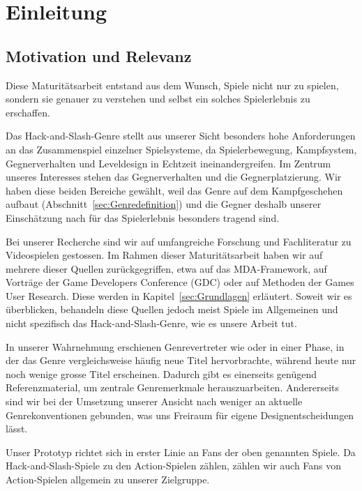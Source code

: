 \documentclass[../Main.tex]{subfiles}
\begin{document}
\section{Einleitung}

\subsection{Motivation und Relevanz}

Diese Maturitätsarbeit entstand aus dem Wunsch, Spiele nicht nur zu spielen, sondern sie genauer zu verstehen und selbst ein solches Spielerlebnis zu erschaffen.

Das Hack-and-Slash-Genre stellt aus unserer Sicht besonders hohe Anforderungen an das Zusammenspiel einzelner Spielsysteme, da Spielerbewegung, Kampfsystem, Gegnerverhalten und Leveldesign in Echtzeit ineinandergreifen. Im Zentrum unseres Interesses stehen das Gegnerverhalten und die Gegnerplatzierung. Wir haben diese beiden Bereiche gewählt, weil das Genre auf dem Kampfgeschehen aufbaut (Abschnitt~\ref{sec:Genredefinition}) und die Gegner deshalb unserer Einschätzung nach für das Spielerlebnis besonders tragend sind.

Bei unserer Recherche sind wir auf umfangreiche Forschung und Fachliteratur zu Videospielen gestossen. Im Rahmen dieser Maturitätsarbeit haben wir auf mehrere dieser Quellen zurückgegriffen, etwa auf das MDA-Framework\autocite{hunicke2004mda}, auf Vorträge der Game Developers Conference (GDC)\autocite{gdc_tenprinciples2010,gdc_movingmountains2020,gdc_horizonquests2018} oder auf Methoden der Games User Research\autocite{drachen2018gamesuserresearch}. Diese werden in Kapitel~\ref{sec:Grundlagen} erläutert. Soweit wir es überblicken, behandeln diese Quellen jedoch meist Spiele im Allgemeinen und nicht spezifisch das Hack-and-Slash-Genre, wie es unsere Arbeit tut.

In unserer Wahrnehmung erschienen Genrevertreter wie \autocite{koeitechmo_ninjagaiden_2012} oder \autocite{platinumgames_nierautomata_2017} in einer Phase, in der das Genre vergleichsweise häufig neue Titel hervorbrachte, während heute nur noch wenige grosse Titel erscheinen. Dadurch gibt es einerseits genügend Referenzmaterial, um zentrale Genremerkmale herauszuarbeiten. Andererseits sind wir bei der Umsetzung unserer Ansicht nach weniger an aktuelle Genrekonventionen gebunden, was uns Freiraum für eigene Designentscheidungen lässt.

Unser Prototyp richtet sich in erster Linie an Fans der oben genannten Spiele. Da Hack-and-Slash-Spiele zu den Action-Spielen zählen,\autocite{wikipedia_hackandslash} zählen wir auch Fans von Action-Spielen allgemein zu unserer Zielgruppe.
\end{document}
